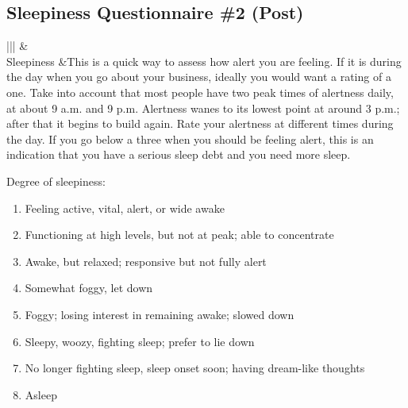 \documentclass[letterpaper,10pt,english]{sphinxmanual}
\begin{document}
\subsection{Sleepiness Questionnaire \#2 (Post)}
\label{\detokenize{Data_Definations_Phase1B:sleepiness-questionnaire-2-post}}

\begin{savenotes}\sphinxattablestart
\centering
\begin{tabular}[t]{|*{2}{|}}
\hline
{}\relax &\relax \\
\hline
Sleepiness
&This is a quick way to assess how alert you are feeling. If it is during the day when you go about your business, ideally you would want a rating of a one. Take into account that most people have two peak times of alertness daily, at about 9 a.m. and 9 p.m. Alertness wanes to its lowest point at around 3 p.m.; after that it begins to build again. Rate your alertness at different times during the day. If you go below a three when you should be feeling alert, this is an indication that you have a serious sleep debt and you need more sleep.

Degree of sleepiness:
\begin{enumerate}
\item {} 
Feeling active, vital, alert, or wide awake

\item {} 
Functioning at high levels, but not at peak; able to concentrate

\item {} 
Awake, but relaxed; responsive but not fully alert

\item {} 
Somewhat foggy, let down

\item {} 
Foggy; losing interest in remaining awake; slowed down

\item {} 
Sleepy, woozy, fighting sleep; prefer to lie down

\item {} 
No longer fighting sleep, sleep onset soon; having dream-like thoughts

\item {} 
Asleep

\end{enumerate}
\\
\hline
\end{tabular}
\par
\sphinxattableend\end{savenotes}
\end{document}
